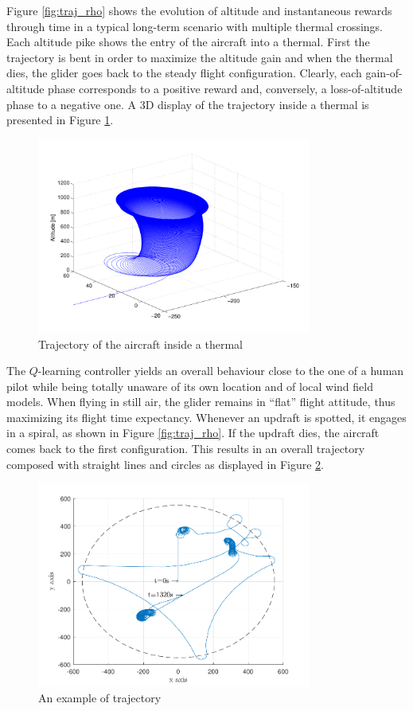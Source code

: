 \documentclass{jfpda}
\begin{document}
Figure \ref{fig:traj_rho} shows the evolution of altitude and instantaneous rewards through time in a typical long-term scenario with multiple thermal crossings. Each altitude pike shows the entry of the aircraft into a thermal. First the trajectory is bent in order to maximize the altitude gain and when the thermal dies, the glider goes back to the steady flight configuration. Clearly, each gain-of-altitude phase corresponds to a positive reward and, conversely, a loss-of-altitude phase to a negative one. A 3D display of the trajectory inside a thermal is presented in Figure \ref{fig:traj_high_alt}.

\begin{figure}
\begin{center}
 \includegraphics[width=9cm]{img/traj_high_alt.pdf}
\end{center}
 \caption{Trajectory of the aircraft inside a thermal}
 \label{fig:traj_high_alt}
\end{figure}

The $Q$-learning controller yields an overall behaviour close to the one of a human pilot while being totally unaware of its own location and of local wind field models. When flying in still air, the glider remains in ``flat'' flight attitude, thus maximizing its flight time expectancy. Whenever an updraft is spotted, it engages in a spiral, as shown in Figure \ref{fig:traj_rho}. If the updraft dies, the aircraft comes back to the first configuration. This results in an overall trajectory composed with straight lines and circles as displayed in Figure \ref{fig:full_traj}.

\begin{figure}
\begin{center}
 \includegraphics[width=9cm]{img/full_traj.pdf}
\end{center}
\caption{An example of trajectory}
\label{fig:full_traj}
\end{figure}
\end{document}
